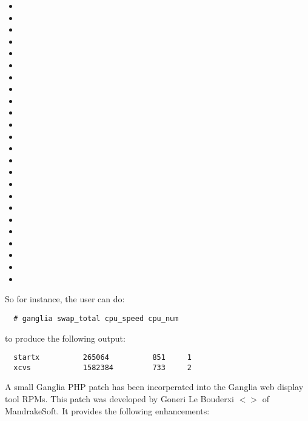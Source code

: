 \begin{itemize}
\item {}
\item {}
\item {}
\item {}
\item {}
\item {}
\item {}
\item {}
\item {}
\item {}
\item {}
\item {}
\item {}
\item {}
\item {}
\item {}
\item {}
\item {}
\item {}
\item {}
\item {}
\item {}
\item {}
\item {}
\end{itemize}

\noindent So for instance, the user can do:

\begin{verbatim}
  # ganglia swap_total cpu_speed cpu_num
\end{verbatim}

\noindent to produce the following output:

\begin{verbatim}
  startx          265064          851     1
  xcvs            1582384         733     2
\end{verbatim}

A small Ganglia PHP patch has been incorperated into the Ganglia web
display tool RPMs. This patch was developed by Goneri Le Bouderxi
$<$$>$ of MandrakeSoft. It provides
the following enhancements:

